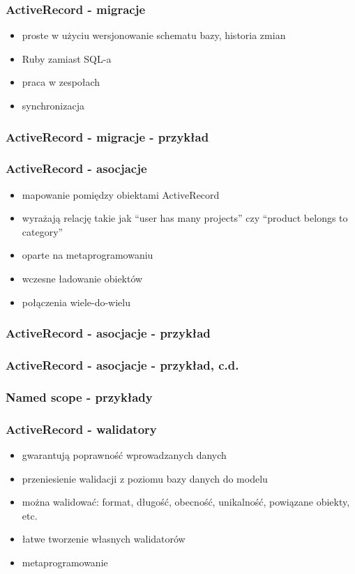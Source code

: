\documentclass[12t]{beamer}
\begin{document}
\begin{frame}
  \frametitle{ActiveRecord - migracje}
  \begin{itemize}
  \item proste w użyciu wersjonowanie schematu bazy, historia zmian
  \item Ruby zamiast SQL-a
  \item praca w zespołach
  \item synchronizacja
  \end{itemize}
\end{frame}

\begin{frame}[fragile]
  \frametitle{ActiveRecord - migracje - przykład}
  
\end{frame}

\begin{frame}
  \frametitle{ActiveRecord - asocjacje}
  \begin{itemize}
  \item mapowanie pomiędzy obiektami ActiveRecord
  \item wyrażają relację takie jak “user has many projects” czy
    “product belongs to category”
  \item oparte na metaprogramowaniu
  \item wczesne ładowanie obiektów
  \item połączenia wiele-do-wielu
  \end{itemize}
\end{frame}

\begin{frame}[fragile]
  \frametitle{ActiveRecord - asocjacje - przykład}
  
\end{frame}

\begin{frame}[fragile]
  \frametitle{ActiveRecord - asocjacje - przykład, c.d.}
  
\end{frame}

\begin{frame}
  \frametitle{Named scope - przykłady}
  
\end{frame}

\begin{frame}
  \frametitle{ActiveRecord - walidatory}
  \begin{itemize}
  \item gwarantują poprawność wprowadzanych danych
  \item przeniesienie walidacji z poziomu bazy danych do modelu
  \item można walidować: format, długość, obecność, unikalność,
    powiązane obiekty, etc.
  \item łatwe tworzenie własnych walidatorów
  \item metaprogramowanie
  \end{itemize}
\end{frame}
\end{document}
